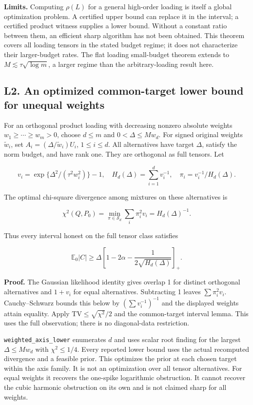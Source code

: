 \textbf{Limits.} Computing \(\rho(L)\) for a general high-order loading
is itself a global optimization problem. A certified upper bound can
replace it in the interval; a certified product witness supplies a lower
bound. Without a constant ratio between them, an efficient sharp
algorithm has not been obtained. This theorem covers all loading tensors
in the stated budget regime; it does not characterize their
larger-budget rates. The flat loading small-budget theorem extends to
\(M\lesssim\tau\sqrt{\log m}\), a larger regime than the
arbitrary-loading result here.

\subsection{L2. An optimized common-target lower bound for unequal
weights}\label{l2.-an-optimized-common-target-lower-bound-for-unequal-weights}\label{sup:L2}

For an orthogonal product loading with decreasing nonzero absolute
weights \(w_1\ge\cdots\ge w_m>0\), choose \(d\le m\) and
\(0<\Delta\le Mw_d\). For signed original weights \(\widetilde w_i\),
set \(A_i=(\Delta/\widetilde w_i)U_i\), \(1\le i\le d\). All
alternatives have target \(\Delta\), satisfy the norm budget, and have
rank one. They are orthogonal as full tensors. Let

\[v_i=\exp\{\Delta^2/(\tau^2w_i^2)\}-1,\quad
H_d(\Delta)=\sum_{i=1}^d v_i^{-1},\quad
\pi_i=v_i^{-1}/H_d(\Delta).\]

The optimal chi-square divergence among mixtures on these alternatives
is

\[\chi^2(Q,P_0)=\min_{\pi\in\mathcal S_d}\sum_i\pi_i^2v_i
=H_d(\Delta)^{-1}.\]

Thus every interval honest on the full tensor class satisfies

\[\mathbb E_0|C|\ge\Delta\left[1-2\alpha-
\frac{1}{2\sqrt{H_d(\Delta)}}\right]_+.\]

\textbf{Proof.} The Gaussian likelihood identity gives overlap 1 for
distinct orthogonal alternatives and \(1+v_i\) for equal alternatives.
Subtracting 1 leaves \(\sum\pi_i^2v_i\). Cauchy--Schwarz bounds this
below by \((\sum v_i^{-1})^{-1}\) and the displayed weights attain
equality. Apply \(\mathrm{TV}\le\sqrt{\chi^2}/2\) and the common-target
interval lemma. This uses the full observation; there is no
diagonal-data restriction.

\texttt{weighted\_axis\_lower} enumerates \(d\) and uses scalar root
finding for the largest \(\Delta\le Mw_d\) with \(\chi^2\le1/4\). Every
reported lower bound uses the actual recomputed divergence and a
feasible prior. This optimizes the prior at each chosen target within
the axis family. It is not an optimization over all tensor alternatives.
For equal weights it recovers the one-spike logarithmic obstruction. It
cannot recover the cubic harmonic obstruction on its own and is not
claimed sharp for all weights.

